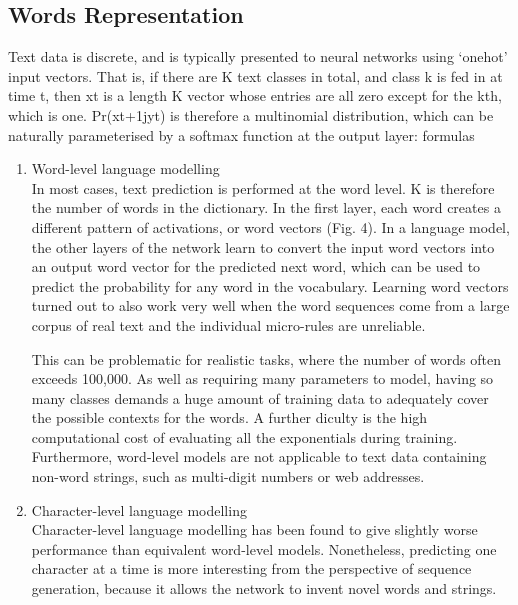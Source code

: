 \subsection{Words Representation}
Text data is discrete, and is typically presented to neural networks using `onehot' input vectors. That is, if there are K text classes in total, and class k is fed in at time t, then xt is a length K vector whose entries are all zero except for the kth, which is one. Pr(xt+1jyt) is therefore a multinomial distribution, which can be naturally parameterised by a softmax function at the output layer:
formulas
\begin{enumerate}
\item Word-level language modelling \\
In most cases, text prediction  is performed at the word level. K is therefore the number of words in the dictionary. \cite{graves2013generating}
In the first layer, each word creates a different pattern of activations, or word vectors (Fig. 4). In a language model, the other layers of the network learn to convert the input word vectors into an output word vector for the predicted next word, which can be used to predict the probability for any word in the vocabulary. Learning word vectors turned out to also work very well when the word sequences come from a large corpus of real text and the individual micro-rules are unreliable.\cite{lecun2015deep}

This can be problematic for realistic tasks, where the number of words often exceeds 100,000. As well as requiring many parameters to model, having so many classes demands a huge amount of training data to adequately cover the possible contexts for the words. A further diculty is the high computational cost of evaluating all the exponentials during training. Furthermore, word-level models are not applicable to text data containing non-word strings, such as multi-digit numbers or web addresses.\cite{graves2013generating}

\item Character-level language modelling \\
Character-level language modelling has been found to give slightly worse performance than equivalent word-level models. Nonetheless, predicting one character at a time is more interesting from the perspective of sequence generation, because it allows the network to invent novel words and strings.
\cite{graves2013generating}


\end{enumerate}